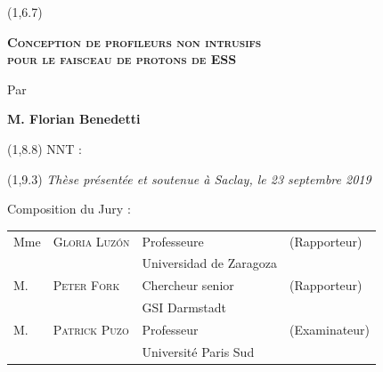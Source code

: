\begin{titlepage}
  \begin{textblock}{14}(1,6.7)
    \begin{center}	
      \Large \textsc{\textcolor{ESSColor}{ \textbf{Conception de profileurs non intrusifs \\pour le faisceau de protons de ESS}}}\par
      \large Par\par  \large \textbf{M. Florian Benedetti} \par
    \end{center}
  \end{textblock}
  
  \begin{textblock}{13}(1,8.8)
    NNT : 
  \end{textblock}
  
  \begin{textblock}{14}(1,9.3)
    \vspace{1.5cm}
    \hspace{1cm}\textit{Thèse présentée et soutenue à Saclay, le 23 septembre 2019}
    \vspace{0.5cm}
    \par
    \hspace{1cm}Composition du Jury :
    \begin{center}
      \begin{tabular}{llll}        
        Mme   & \textsc{Gloria Luz\'{o}n}        & Professeure             & (Rapporteur)           \\
        \null & \null                        & Universidad de Zaragoza &                        \\ 
        
        M.    & \textsc{Peter Fork}          & Chercheur senior        & (Rapporteur)           \\
        \null & \null                        & GSI Darmstadt           &                        \\ 
        M.    & \textsc{Patrick Puzo}        & Professeur              & (Examinateur)    \\
        \null & \null                        & Université Paris Sud    &                        \\   


\end{tabular}
\end{center}
\end{textblock}
\end{titlepage}

